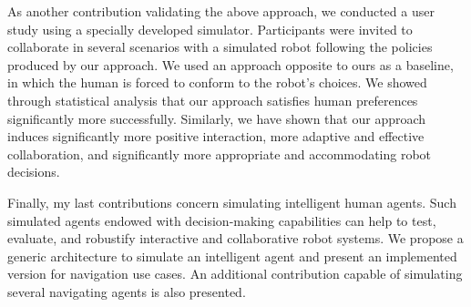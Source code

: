 As another contribution validating the above approach, we conducted a user study using a specially developed simulator. Participants were invited to collaborate in several scenarios with a simulated robot following the policies produced by our approach. We used an approach opposite to ours as a baseline, in which the human is forced to conform to the robot's choices. We showed through statistical analysis that our approach satisfies human preferences significantly more successfully. Similarly, we have shown that our approach induces significantly more positive interaction, more adaptive and effective collaboration, and significantly more appropriate and accommodating robot decisions.

Finally, my last contributions concern simulating intelligent human agents. Such simulated agents endowed with decision-making capabilities can help to test, evaluate, and robustify interactive and collaborative robot systems. We propose a generic architecture to simulate an intelligent agent and present an implemented version for navigation use cases. An additional contribution capable of simulating several navigating agents is also presented.  

